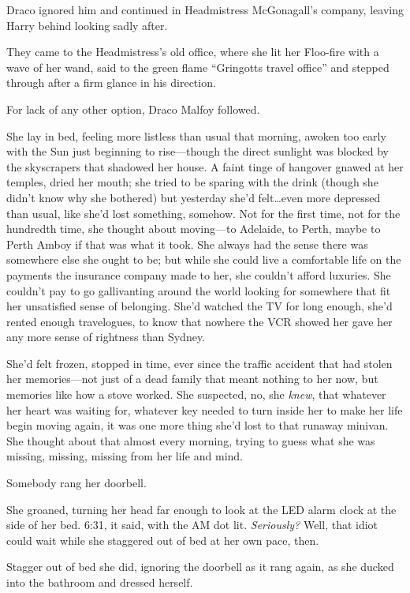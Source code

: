 Draco ignored him and continued in Headmistress McGonagall’s company, leaving Harry behind looking sadly after.

They came to the Headmistress’s old office, where she lit her Floo-fire with a wave of her wand, said to the green flame “Gringotts travel office” and stepped through after a firm glance in his direction.

For lack of any other option, Draco Malfoy followed.

\later

She lay in bed, feeling more listless than usual that morning, awoken too early with the Sun just beginning to rise—though the direct sunlight was blocked by the skyscrapers that shadowed her house. A faint tinge of hangover gnawed at her temples, dried her mouth; she tried to be sparing with the drink (though she didn’t know why she bothered) but yesterday she’d felt…even more depressed than usual, like she’d lost something, somehow. Not for the first time, not for the hundredth time, she thought about moving—to Adelaide, to Perth, maybe to Perth Amboy if that was what it took. She always had the sense there was somewhere else she ought to be; but while she could live a comfortable life on the payments the insurance company made to her, she couldn’t afford luxuries. She couldn’t pay to go gallivanting around the world looking for somewhere that fit her unsatisfied sense of belonging. She’d watched the TV for long enough, she’d rented enough travelogues, to know that nowhere the VCR showed her gave her any more sense of rightness than Sydney.

She’d felt frozen, stopped in time, ever since the traffic accident that had stolen her memories—not just of a dead family that meant nothing to her now, but memories like how a stove worked. She suspected, no, she \emph{knew}, that whatever her heart was waiting for, whatever key needed to turn inside her to make her life begin moving again, it was one more thing she’d lost to that runaway minivan. She thought about that almost every morning, trying to guess what she was missing, missing, missing from her life and mind.

Somebody rang her doorbell.

She groaned, turning her head far enough to look at the LED alarm clock at the side of her bed. 6:31, it said, with the AM dot lit. \emph{Seriously?} Well, that idiot could wait while she staggered out of bed at her own pace, then.

Stagger out of bed she did, ignoring the doorbell as it rang again, as she ducked into the bathroom and dressed herself.

